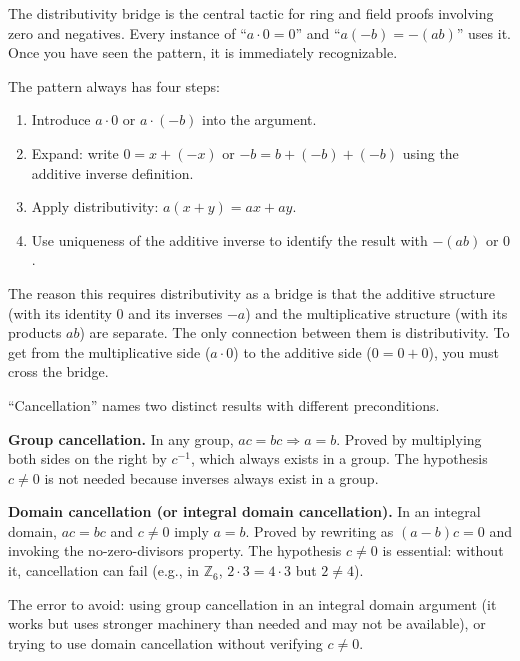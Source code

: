 \begin{remark}
The distributivity bridge is the central tactic for ring and field
proofs involving zero and negatives. Every instance of ``$a \cdot 0 = 0$''
and ``$a(-b) = -(ab)$'' uses it. Once you have seen the pattern, it is
immediately recognizable.

The pattern always has four steps:
\begin{enumerate}[itemsep=2pt]
  \item Introduce $a \cdot 0$ or $a \cdot (-b)$ into the argument.
  \item Expand: write $0 = x + (-x)$ or $-b = b + (-b) + (-b)$ using
    the additive inverse definition.
  \item Apply distributivity: $a(x + y) = ax + ay$.
  \item Use uniqueness of the additive inverse to identify the result
    with $-(ab)$ or $0$.
\end{enumerate}

The reason this requires distributivity as a bridge is that the
additive structure (with its identity $0$ and its inverses $-a$) and
the multiplicative structure (with its products $ab$) are separate. The
only connection between them is distributivity. To get from the multiplicative
side ($a \cdot 0$) to the additive side ($0 = 0 + 0$), you must cross
the bridge.
\end{remark}

\begin{remark}
``Cancellation'' names two distinct results with different preconditions.

\medskip
\noindent\textbf{Group cancellation.} In any group, $ac = bc \Rightarrow a = b$.
Proved by multiplying both sides on the right by $c^{-1}$, which always
exists in a group. The hypothesis $c \neq 0$ is not needed because
inverses always exist in a group.

\medskip
\noindent\textbf{Domain cancellation (or integral domain cancellation).}
In an integral domain, $ac = bc$ and $c \neq 0$ imply $a = b$.
Proved by rewriting as $(a - b)c = 0$ and invoking the no-zero-divisors
property. The hypothesis $c \neq 0$ is essential: without it, cancellation
can fail (e.g., in $\mathbb{Z}_6$, $2 \cdot 3 = 4 \cdot 3$ but $2 \neq 4$).

\medskip
\noindent
The error to avoid: using group cancellation in an integral domain
argument (it works but uses stronger machinery than needed and may not
be available), or trying to use domain cancellation without verifying
$c \neq 0$.
\end{remark}

